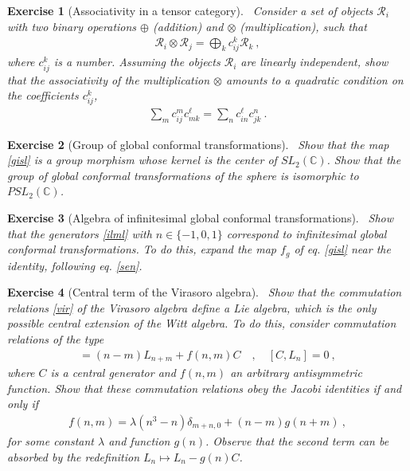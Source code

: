 \documentclass[12pt, a4paper, notitlepage, twoside]{report}
\numberwithin{equation}{section}
\theoremstyle{break}
\newtheorem{exo}{Exercise}[chapter]
\begin{document}
\begin{exo}[Associativity in a tensor category]
 ~\label{exoten}
Consider a set of objects $\mathcal{R}_i$ with two binary operations $\oplus$ (addition) and $\otimes$ (multiplication), such that 
\begin{align}
 \mathcal{R}_i \otimes \mathcal{R}_j = \bigoplus_k c_{ij}^k \mathcal{R}_k\ ,
\end{align}
where $c_{ij}^k$ is a number.
Assuming the objects $\mathcal{R}_i$ are linearly independent, show that the associativity of the multiplication $\otimes$ amounts to a quadratic condition on the coefficients $c_{ij}^k$,
\begin{align}
 \sum_m c_{ij}^m c_{mk}^\ell = \sum_n c_{in}^\ell c_{jk}^n\ .
\end{align}
\end{exo}

\begin{exo}[Group of global conformal transformations]
 ~\label{exoiso}
Show that the map \eqref{gisl} is a group morphism whose kernel is the center of $SL_2({\mathbb{C}})$.
Show that the group of global conformal transformations of the sphere is isomorphic to $PSL_2({\mathbb{C}})$. 
\end{exo}

\begin{exo}[Algebra of infinitesimal global conformal transformations]
 ~\label{exomoz}
Show that the generators \eqref{ilml} with $n\in\{-1,0,1\}$ correspond to infinitesimal global conformal transformations.
To do this, expand the map $f_g$ of eq. \eqref{gisl} near the identity, following eq. \eqref{sen}.
\end{exo}


\begin{exo}[Central term of the Virasoro algebra]
~\label{exovir}
 Show that the commutation relations \eqref{vir} of the Virasoro algebra define a Lie algebra, which is the only possible central extension of the Witt algebra.
To do this, consider commutation relations of the type
\begin{align}
 [L_n,L_m] =(n-m)L_{n+m} + f(n,m) C  \quad , \quad [C,L_n]=0\ ,
\end{align}
where $C$ is a central generator and $f(n,m)$ an arbitrary antisymmetric function.
Show that these commutation relations obey the Jacobi identities if and only if 
\begin{align}
 f(n,m) = \lambda (n^3-n)\delta_{m+n,0} + (n-m)g(n+m)\ ,
\end{align}
for some constant $\lambda$ and function $g(n)$.
Observe that the second term can be absorbed by the redefinition $L_n\mapsto L_n-g(n)C$.
\end{exo}
\end{document}
